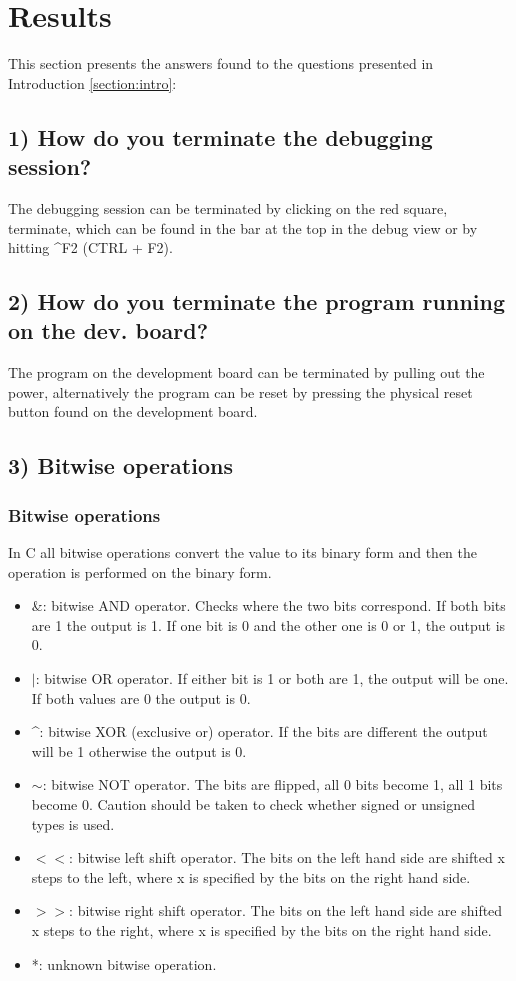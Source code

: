 \section{Results}
\label{section:results}
This section presents the answers found to the questions presented in Introduction \ref{section:intro}:

\subsection{1) How do you terminate the debugging session?}
The debugging session can be terminated by clicking on the red square, terminate, which can be found in the bar at the top in the debug view or by hitting {\textasciicircum}F2 (CTRL + F2).

\subsection{2) How do you terminate the program running on the dev. board?}
The program on the development board can be terminated by pulling out the power, alternatively the program can be reset by pressing the physical reset button found on the development board.
\subsection{3) Bitwise operations}
\subsubsection{Bitwise operations}
In C all bitwise operations convert the value to its binary form and then the operation is performed on the binary form.
\begin{itemize}
    \item \&: bitwise AND operator. Checks where the two bits correspond. If both bits are 1 the output is 1. If one bit is 0 and the other one is 0 or 1, the output is 0.
    \item $|$: bitwise OR operator. If either bit is 1 or both are 1, the output will be one. If both values are 0 the output is 0.
    \item \textasciicircum: bitwise XOR (exclusive or) operator. If the bits are different the output will be 1 otherwise the output is 0.
    \item $\sim$: bitwise NOT operator. The bits are flipped, all 0 bits become 1, all 1 bits become 0. Caution should be taken to check whether signed or unsigned types is used.
    \item $<<$: bitwise left shift operator. The bits on the left hand side are shifted x steps to the left, where x is specified by the bits on the right hand side.
    \item $>>$: bitwise right shift operator. The bits on the left hand side are shifted x steps to the right, where x is specified by the bits on the right hand side.
    \item *: unknown bitwise operation.
\end{itemize}

